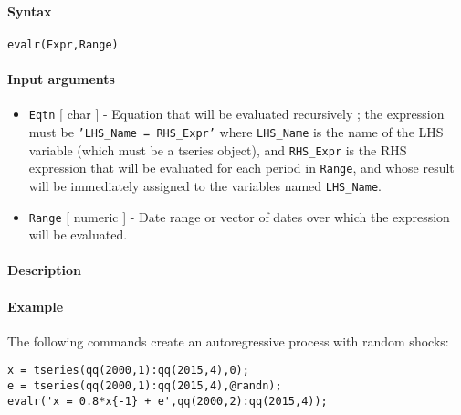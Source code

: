


	\paragraph{Syntax}\label{syntax}

\begin{verbatim}
evalr(Expr,Range)
\end{verbatim}

\paragraph{Input arguments}\label{input-arguments}

\begin{itemize}
\item
  \texttt{Eqtn} {[} char {]} - Equation that will be evaluated
  recursively ; the expression must be \texttt{'LHS\_Name = RHS\_Expr'}
  where \texttt{LHS\_Name} is the name of the LHS variable (which must
  be a tseries object), and \texttt{RHS\_Expr} is the RHS expression
  that will be evaluated for each period in \texttt{Range}, and whose
  result will be immediately assigned to the variables named
  \texttt{LHS\_Name}.
\item
  \texttt{Range} {[} numeric {]} - Date range or vector of dates over
  which the expression will be evaluated.
\end{itemize}

\paragraph{Description}\label{description}

\paragraph{Example}\label{example}

The following commands create an autoregressive process with random
shocks:

\begin{verbatim}
x = tseries(qq(2000,1):qq(2015,4),0);
e = tseries(qq(2000,1):qq(2015,4),@randn);
evalr('x = 0.8*x{-1} + e',qq(2000,2):qq(2015,4));
\end{verbatim}


